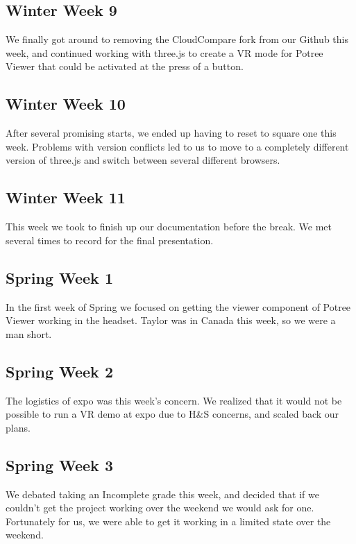 \documentclass{article}
\begin{document}
\subsection{Winter Week 9}

We finally got around to removing the CloudCompare fork from our Github this week, and continued working with three.js to create a VR mode for Potree Viewer that could be activated at the press of a button.

\subsection{Winter Week 10}

After several promising starts, we ended up having to reset to square one this week. 
Problems with version conflicts led to us to move to a completely different version of three.js and switch between several different browsers.

\subsection{Winter Week 11}

This week we took to finish up our documentation before the break. We met several times to record for the final presentation.

\subsection{Spring Week 1}

In the first week of Spring we focused on getting the viewer component of Potree Viewer working in the headset. 
Taylor was in Canada this week, so we were a man short.

\subsection{Spring Week 2}

The logistics of expo was this week’s concern. 
We realized that it would not be possible to run a VR demo at expo due to H&S concerns, and scaled back our plans.

\subsection{Spring Week 3}

We debated taking an Incomplete grade this week, and decided that if we couldn’t get the project working over the weekend we would ask for one. 
Fortunately for us, we were able to get it working in a limited state over the weekend.
\end{document}
